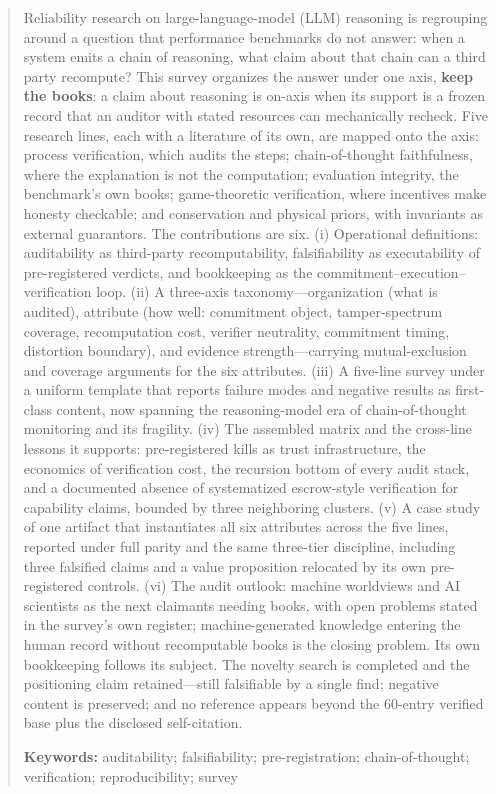 \documentclass[11pt,a4paper]{article}
\begin{document}
\begin{abstract}


Reliability research on large-language-model (LLM) reasoning is regrouping around a question that performance benchmarks do not answer: when a system emits a chain of reasoning, what claim about that chain can a third party recompute? This survey organizes the answer under one axis, \textbf{keep the books}: a claim about reasoning is on-axis when its support is a frozen record that an auditor with stated resources can mechanically recheck. Five research lines, each with a literature of its own, are mapped onto the axis: process verification, which audits the steps; chain-of-thought faithfulness, where the explanation is not the computation; evaluation integrity, the benchmark's own books; game-theoretic verification, where incentives make honesty checkable; and conservation and physical priors, with invariants as external guarantors. The contributions are six. (i) Operational definitions: auditability as third-party recomputability, falsifiability as executability of pre-registered verdicts, and bookkeeping as the commitment–execution–verification loop. (ii) A three-axis taxonomy—organization (what is audited), attribute (how well: commitment object, tamper-spectrum coverage, recomputation cost, verifier neutrality, commitment timing, distortion boundary), and evidence strength—carrying mutual-exclusion and coverage arguments for the six attributes. (iii) A five-line survey under a uniform template that reports failure modes and negative results as first-class content, now spanning the reasoning-model era of chain-of-thought monitoring and its fragility. (iv) The assembled matrix and the cross-line lessons it supports: pre-registered kills as trust infrastructure, the economics of verification cost, the recursion bottom of every audit stack, and a documented absence of systematized escrow-style verification for capability claims, bounded by three neighboring clusters. (v) A case study of one artifact that instantiates all six attributes across the five lines, reported under full parity and the same three-tier discipline, including three falsified claims and a value proposition relocated by its own pre-registered controls. (vi) The audit outlook: machine worldviews and AI scientists as the next claimants needing books, with open problems stated in the survey's own register; machine-generated knowledge entering the human record without recomputable books is the closing problem. Its own bookkeeping follows its subject. The novelty search is completed and the positioning claim retained—still falsifiable by a single find; negative content is preserved; and no reference appears beyond the 60-entry verified base plus the disclosed self-citation.

\noindent\textbf{Keywords:} auditability; falsifiability; pre-registration; chain-of-thought; verification; reproducibility; survey
\end{abstract}
\end{document}
